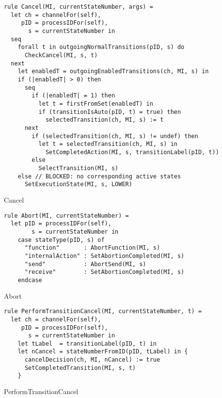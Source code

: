 \begin{listing}[H]
\begin{verbatim}
rule Cancel(MI, currentStateNumber, args) =
  let ch = channelFor(self),
     pID = processIDFor(self),
       s = currentStateNumber in
  seq
    forall t in outgoingNormalTransitions(pID, s) do
      CheckCancel(MI, s, t)
  next
    let enabledT = outgoingEnabledTransitions(ch, MI, s) in
    if (|enabledT| > 0) then
      seq
        if (|enabledT| = 1) then
          let t = firstFromSet(enabledT) in
          if (transitionIsAuto(pID, t) = true) then
            selectedTransition(ch, MI, s) := t
      next
        if (selectedTransition(ch, MI, s) != undef) then
          let t = selectedTransition(ch, MI, s) in
            SetCompletedAction(MI, s, transitionLabel(pID, t))
        else
          SelectTransition(MI, s)
    else // BLOCKED: no corresponding active states
      SetExecutionState(MI, s, LOWER)
\end{verbatim}
\caption{Cancel}
\label{lst:asm:Cancel}
\end{listing}


\begin{listing}[H]
\begin{verbatim}
rule Abort(MI, currentStateNumber) =
  let pID = processIDFor(self),
        s = currentStateNumber in
    case stateType(pID, s) of
      "function"       : AbortFunction(MI, s)
      "internalAction" : SetAbortionCompleted(MI, s)
      "send"           : AbortSend(MI, s)
      "receive"        : SetAbortionCompleted(MI, s)
    endcase
\end{verbatim}
\caption{Abort}
\label{lst:asm:Abort}
\end{listing}


\begin{listing}[H]
\begin{verbatim}
rule PerformTransitionCancel(MI, currentStateNumber, t) =
  let ch = channelFor(self),
     pID = processIDFor(self),
       s = currentStateNumber in
    let tLabel  = transitionLabel(pID, t) in
    let nCancel = stateNumberFromID(pID, tLabel) in {
      cancelDecision(ch, MI, nCancel) := true
      SetCompletedTransition(MI, s, t)
    }
\end{verbatim}
\caption{PerformTransitionCancel}
\label{lst:asm:PerformTransitionCancel}
\end{listing}






